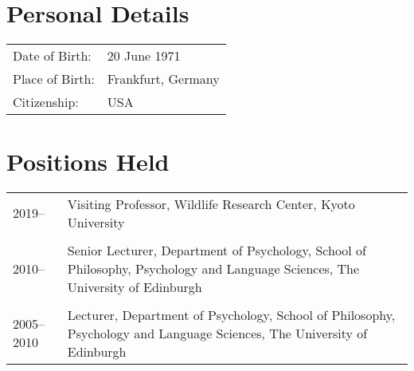 \documentclass[11pt]{article}
\begin{document}

\noindent{\rule{\textwidth}{1pt}} \\


\section*{Personal Details}
\begin{tabular}{p{3cm}p{12cm}}
Date of Birth: & 20 June 1971 \\
Place of Birth: & Frankfurt, Germany \\
Citizenship: & USA
\end{tabular}

\section*{Positions Held}

\begin{tabular}{p{3cm}p{12cm}}
2019-- & Visiting Professor, Wildlife Research Center, Kyoto University \\ \\

2010-- & Senior Lecturer, Department of Psychology, School of
Philosophy, Psychology and Language Sciences, The University of
Edinburgh \\ \\

2005--2010 & Lecturer, Department of Psychology, School of
Philosophy, Psychology and Language Sciences, The University of
Edinburgh 
\end{tabular}
\end{document}
